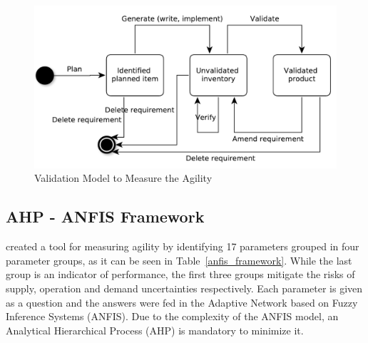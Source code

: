\begin{figure} [H]
\centerline{\includegraphics[scale=0.6]{include/relatedwork/fig/validation_model.pdf}}
\caption{Validation Model to Measure the Agility} 
\label{validation_model}
\end{figure}

\subsection{AHP - ANFIS Framework} %
\citet{poonacha} created a tool for measuring agility by identifying 17 parameters grouped in four parameter groups, as it can be seen in Table~\ref{anfis_framework}. While the last group is an indicator of performance, the first three groups mitigate the risks of supply, operation and demand uncertainties respectively. Each parameter is given as a question and the answers were fed in the Adaptive Network based on Fuzzy Inference Systems (ANFIS). Due to the complexity of the ANFIS model, an Analytical Hierarchical Process (AHP) is mandatory to minimize it.

